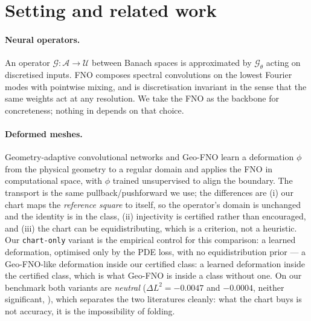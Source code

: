 \documentclass[11pt,a4paper]{article}
\theoremstyle{plain}
\theoremstyle{definition}
\newcommand{\code}[1]{\texttt{#1}}
\begin{document}
\section{Setting and related work}
\label{sec:related}

\paragraph{Neural operators.}  An operator $\mathcal{G}:\mathcal{A}\to\mathcal{U}$
between Banach spaces is approximated by $\mathcal{G}_\theta$ acting on
discretised inputs.  FNO \cite{li2021fno} composes spectral convolutions on the
lowest Fourier modes with pointwise mixing, and is discretisation invariant in
the sense that the same weights act at any resolution.  We take the FNO as the
backbone for concreteness; nothing in  depends on that
choice.

\paragraph{Deformed meshes.}  Geometry-adaptive convolutional networks
\cite{gao2021phygeonet} and Geo-FNO \cite{li2022geofno} learn a deformation
$\phi$ from the physical geometry to a regular domain and applies the FNO in
computational space, with $\phi$ trained unsupervised to align the boundary.
The transport is the same pullback/pushforward we use; the differences are
(i) our chart maps the \emph{reference square} to itself, so the operator's
domain is unchanged and the identity is in the class, (ii) injectivity is
certified rather than encouraged, and (iii) the chart can be equidistributing,
which is a criterion, not a heuristic.  Our \code{chart-only} variant is the
empirical control for this comparison: a learned deformation, optimised only by
the PDE loss, with no equidistribution prior — a Geo-FNO-like deformation inside
our certified class: a learned deformation inside the certified class, which is
what Geo-FNO is inside a class without one.  On our benchmark both variants are
\emph{neutral} ($\Delta L^2=-0.0047$ and $-0.0004$, neither significant,
), which separates the two literatures cleanly: what the
chart buys is not accuracy, it is the impossibility of folding.
\end{document}
